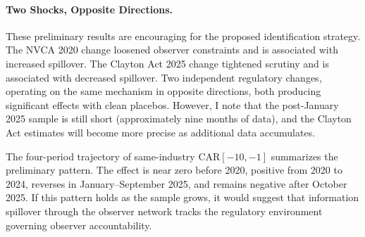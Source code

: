 \paragraph{Two Shocks, Opposite Directions.} These preliminary results are encouraging for the proposed identification strategy. The NVCA 2020 change loosened observer constraints and is associated with increased spillover. The Clayton Act 2025 change tightened scrutiny and is associated with decreased spillover. Two independent regulatory changes, operating on the same mechanism in opposite directions, both producing significant effects with clean placebos. However, I note that the post-January 2025 sample is still short (approximately nine months of data), and the Clayton Act estimates will become more precise as additional data accumulates.

The four-period trajectory of same-industry CAR$[-10,-1]$ summarizes the preliminary pattern. The effect is near zero before 2020, positive from 2020 to 2024, reverses in January--September 2025, and remains negative after October 2025. If this pattern holds as the sample grows, it would suggest that information spillover through the observer network tracks the regulatory environment governing observer accountability.